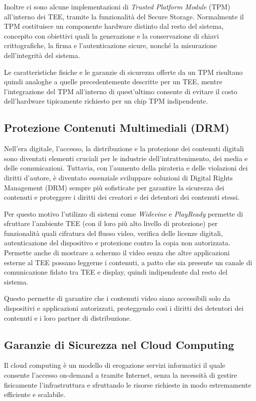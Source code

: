\documentclass[12pt,italian]{report}
\begin{document}
	\bigbreak 
	
	Inoltre ci sono alcune implementazioni di \textit{Trusted Platform Module} (TPM) all'interno dei TEE, tramite la funzionalità del Secure Storage. Normalmente il TPM costituisce un componente hardware distinto dal resto del sistema, concepito con obiettivi quali la generazione e la conservazione di chiavi crittografiche, la firma e l'autenticazione sicure, nonché la misurazione dell'integrità del sistema.
	
	Le caratteristiche fisiche e le garanzie di sicurezza offerte da un TPM risultano quindi analoghe a quelle precedentemente descritte per un TEE, mentre l'integrazione del TPM all'interno di quest'ultimo consente di evitare il costo dell'hardware tipicamente richiesto per un chip TPM indipendente.
	
	\subsection{Protezione Contenuti Multimediali (DRM)}
	\label{subsec:drm}
	Nell'era digitale, l'accesso, la distribuzione e la protezione dei contenuti digitali sono diventati elementi cruciali per le industrie dell'intrattenimento, dei media e delle comunicazioni. Tuttavia, con l'aumento della pirateria e delle violazioni dei diritti d'autore, è diventato essenziale sviluppare soluzioni di Digital Rights Management (DRM) sempre più sofisticate per garantire la sicurezza dei contenuti e proteggere i diritti dei creatori e dei detentori dei contenuti stessi.
	
	\bigbreak
	
	Per questo motivo l'utilizzo di sistemi come \textit{Widevine} \cite{widevine} e \textit{PlayReady} \cite{playready} permette di sfruttare l'ambiente TEE (con il loro più alto livello di protezione) per funzionalità quali cifratura del flusso video, verifica delle licenze digitali, autenticazione del dispositivo e protezione contro la copia non autorizzata. Permette anche di mostrare a schermo il video senza che altre applicazioni esterne al TEE possano leggerne i contenuti, a patto che sia presente un canale di comunicazione fidato tra TEE e display, quindi indipendente dal resto del sistema.
	
	Questo permette di garantire che i contenuti video siano accessibili solo da dispositivi e applicazioni autorizzati, proteggendo così i diritti dei detentori dei contenuti e i loro partner di distribuzione. 
	
	\subsection{Garanzie di Sicurezza nel Cloud Computing}
	\label{subsec:protezione-cloud}
	Il cloud computing è un modello di erogazione servizi informatici il quale consente l'accesso on-demand a tramite Internet, senza la necessità di gestire fisicamente l'infrastruttura e sfruttando le risorse richieste in modo estremamente efficiente e scalabile.
	
\end{document}
